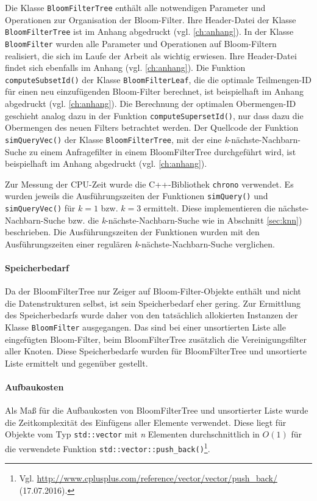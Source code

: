 Die Klasse \texttt{BloomFilterTree} enthält alle notwendigen Parameter und Operationen zur Organisation der Bloom-Filter. Ihre Header-Datei der Klasse \texttt{BloomFilterTree} ist im Anhang abgedruckt (vgl. \ref{ch:anhang}). In der Klasse \texttt{BloomFilter} wurden alle Parameter und Operationen auf Bloom-Filtern realisiert, die sich im Laufe der Arbeit als wichtig erwiesen. Ihre Header-Datei findet sich ebenfalls im Anhang (vgl. \ref{ch:anhang}). Die Funktion \texttt{computeSubsetId()} der Klasse \texttt{BloomFilterLeaf}, die die optimale Teilmengen-ID für einen neu einzufügenden Bloom-Filter berechnet, ist beispielhaft im Anhang abgedruckt (vgl. \ref{ch:anhang}). Die Berechnung der optimalen Obermengen-ID geschieht analog dazu in der Funktion \texttt{computeSupersetId()}, nur dass dazu die Obermengen des neuen Filters betrachtet werden. Der Quellcode der Funktion \mbox{\texttt{simQueryVec()}} der Klasse \texttt{BloomFilterTree}, mit der eine \textit{k}-nächste-Nachbarn-Suche zu einem Anfragefilter in einem BloomFilterTree durchgeführt wird, ist beispielhaft im Anhang abgedruckt (vgl. \ref{ch:anhang}).

Zur Messung der CPU-Zeit wurde die C++-Bibliothek \texttt{chrono} verwendet. Es wurden jeweils die Ausführungszeiten der Funktionen \texttt{simQuery()} und \texttt{simQueryVec()} für $k=1$ bzw. $k=3$ ermittelt. Diese implementieren die nächste-Nachbarn-Suche bzw. die \textit{k}-nächste-Nachbarn-Suche wie in Abschnitt \ref{sec:knn}) beschrieben. Die Ausführungszeiten der Funktionen wurden mit den Ausführungszeiten einer regulären \textit{k}-nächste-Nachbarn-Suche verglichen.
\paragraph*{Speicherbedarf} 
Da der BloomFilterTree nur Zeiger auf Bloom-Filter-Objekte enthält und nicht die Datenstrukturen selbst, ist sein Speicherbedarf eher gering. Zur Ermittlung des Speicherbedarfs wurde daher von den tatsächlich allokierten Instanzen der Klasse \texttt{BloomFilter} ausgegangen. Das sind bei einer unsortierten Liste alle eingefügten Bloom-Filter, beim BloomFilterTree zusätzlich die Vereinigungsfilter aller Knoten. Diese Speicherbedarfe wurden für BloomFilterTree und unsortierte Liste ermittelt und gegenüber gestellt. 
\paragraph*{Aufbaukosten}
Als Maß für die Aufbaukosten von BloomFilterTree und unsortierter Liste wurde die Zeitkomplexität des Einfügens aller Elemente verwendet. Diese liegt für Objekte vom Typ \texttt{std::vector} mit \textit{n} Elementen durchschnittlich in $O(1)$ für die verwendete Funktion \texttt{std::vector::push\_back()}\footnote{Vgl. \url{http://www.cplusplus.com/reference/vector/vector/push_back/} (17.07.2016).}. 

